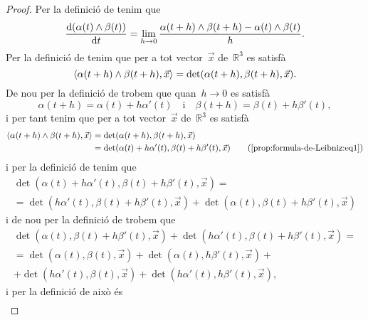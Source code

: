 \documentclass[../geometria-diferencial.tex]{subfiles}
\begin{document}
    \begin{proof}
        Per la definició de  tenim que
        \begin{equation}
            \label{prop:formula-de-Leibniz:eq2}
            \frac{\mathop{}\!\mathrm{d}(\alpha(t)\mathbin{\wedge}\beta(t))}{\mathop{}\!\mathrm{d} t}=\lim_{h\to0}\frac{\alpha(t+h)\mathbin{\wedge}\beta(t+h)-\alpha(t)\mathbin{\wedge}\beta(t)}{h}.
        \end{equation}
        Per la definició de  tenim que per a tot vector~\(\vec{x}\) de~\(\mathbb{R}^{3}\) es satisfà
        \[
            \prodesc{\alpha(t+h)\prodvec\beta(t+h)}{\vec{x}}=\det(\alpha(t+h),\beta(t+h),\vec{x}).
        \]
        De nou per la definició de  trobem que quan~\(h\to0\) es satisfà
        \begin{equation}
            \label{prop:formula-de-Leibniz:eq1}
            \alpha(t+h)=\alpha(t)+h\alpha'(t)\quad\text{i}\quad\beta(t+h)=\beta(t)+h\beta'(t),
        \end{equation}
        i per tant tenim que per a tot vector~\(\vec{x}\) de~\(\mathbb{R}^{3}\) es satisfà
        \begin{align*}
            \prodesc{\alpha(t+h)\prodvec\beta(t+h)}{\vec{x}}&=\det(\alpha(t+h),\beta(t+h),\vec{x}) \\
            &=\det(\alpha(t)+h\alpha'(t),\beta(t)+h\beta'(t),\vec{x}) \tag{\ref{prop:formula-de-Leibniz:eq1}}
        \end{align*}
        i per la definició de  tenim que
        \begin{multline*}
            \det(\alpha(t)+h\alpha'(t),\beta(t)+h\beta'(t),\vec{x})=\\
            =\det(h\alpha'(t),\beta(t)+h\beta'(t),\vec{x})+\det(\alpha(t),\beta(t)+h\beta'(t),\vec{x})
        \end{multline*}
        i de nou per la definició de  trobem que
        \begin{multline*}
            \det(\alpha(t),\beta(t)+h\beta'(t),\vec{x})+\det(h\alpha'(t),\beta(t)+h\beta'(t),\vec{x})=\\
            =\det(\alpha(t),\beta(t),\vec{x})+\det(\alpha(t),h\beta'(t),\vec{x})+\\
            +\det(h\alpha'(t),\beta(t),\vec{x})+\det(h\alpha'(t),h\beta'(t),\vec{x}),
        \end{multline*}
        i per la definició de  això és
        \begin{multline*}

\end{multline*}
\end{proof}
\end{document}
